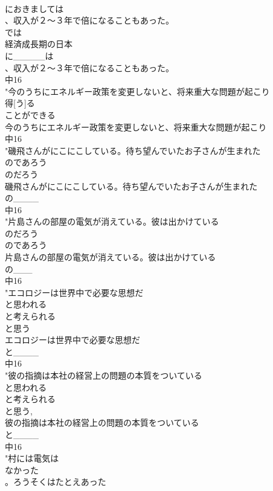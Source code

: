 \documentclass[8pt]{extreport}
\begin{document}
\begin{CJK}{UTF8}{min}
\\	におきましては
\\	、収入が２～３年で倍になることもあった。
\\	では 
\\	経済成長期の日本
\\	に_____は
\\	、収入が２～３年で倍になることもあった。
\\	中16
\\	"今のうちにエネルギー政策を変更しないと、将来重大な問題が起こり
\\	得[う]る
\\	ことができる 
\\	今のうちにエネルギー政策を変更しないと、将来重大な問題が起こり
\\	中16
\\	"磯飛さんがにこにこしている。待ち望んでいたお子さんが生まれた
\\	のであろう
\\	のだろう
\\	磯飛さんがにこにこしている。待ち望んでいたお子さんが生まれた
\\	の____
\\	中16
\\	"片島さんの部屋の電気が消えている。彼は出かけている
\\	のだろう
\\	のであろう
\\	片島さんの部屋の電気が消えている。彼は出かけている
\\	の___
\\	中16
\\	"エコロジーは世界中で必要な思想だ
\\	と思われる
\\	と考えられる
\\	と思う 
\\	エコロジーは世界中で必要な思想だ
\\	と____
\\	中16
\\	"彼の指摘は本社の経営上の問題の本質をついている
\\	と思われる
\\	と考えられる
\\	と思う, 
\\	彼の指摘は本社の経営上の問題の本質をついている
\\	と____
\\	中16
\\	"村には電気は
\\	なかった
\\	。ろうそくはたとえあった

\end{CJK}
\end{document}
